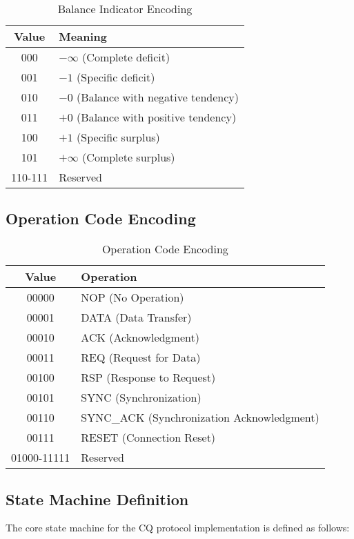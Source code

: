\documentclass[../../../OAE-SPEC-MAIN.tex]{subfiles}
\begin{document}
\begin{table}[h]
\centering
\begin{tabular}{|c|l|}
\hline
\textbf{Value} & \textbf{Meaning} \\
\hline
000 & $-\infty$ (Complete deficit) \\
001 & $-1$ (Specific deficit) \\
010 & $-0$ (Balance with negative tendency) \\
011 & $+0$ (Balance with positive tendency) \\
100 & $+1$ (Specific surplus) \\
101 & $+\infty$ (Complete surplus) \\
110-111 & Reserved \\
\hline
\end{tabular}
\caption{Balance Indicator Encoding}
\end{table}

\subsection{Operation Code Encoding}

\begin{table}[h]
\centering
\begin{tabular}{|c|l|}
\hline
\textbf{Value} & \textbf{Operation} \\
\hline
00000 & NOP (No Operation) \\
00001 & DATA (Data Transfer) \\
00010 & ACK (Acknowledgment) \\
00011 & REQ (Request for Data) \\
00100 & RSP (Response to Request) \\
00101 & SYNC (Synchronization) \\
00110 & SYNC\_ACK (Synchronization Acknowledgment) \\
00111 & RESET (Connection Reset) \\
01000-11111 & Reserved \\
\hline
\end{tabular}
\caption{Operation Code Encoding}
\end{table}

\subsection{State Machine Definition}

The core state machine for the CQ protocol implementation is defined as follows:
\end{document}
